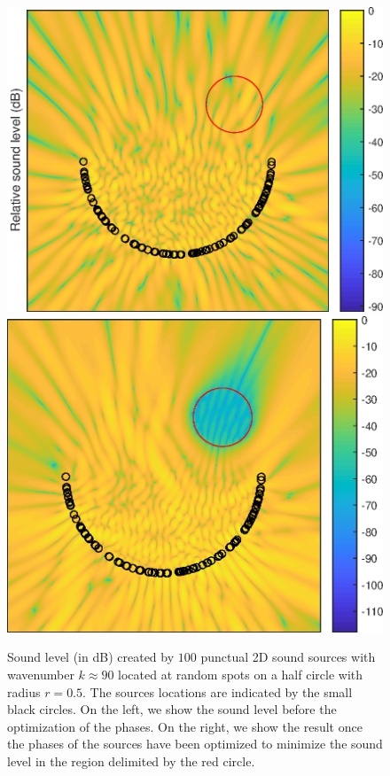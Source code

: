 \documentclass[smallextended]{svjour3}
\begin{document}
\begin{figure}
	\centering	
	\includegraphics[scale = 0.45]{epsFig1_new.eps}		
	\includegraphics[scale = 0.45]{epsFig2_new.eps}
	\caption{Sound level (in dB) created by $100$ punctual 2D sound sources with wavenumber $k\approx 90$ located at random spots on a half circle with radius $r = 0.5$. The sources locations are indicated by the small black circles. On the left, we show the sound level before the optimization of the phases. On the right, we show the result once the phases of the sources have been optimized to minimize the sound level in the region delimited by the red circle. }
	\label{figMinimizationHelmholtz}
\end{figure}


																																																																																																					
\end{document}

